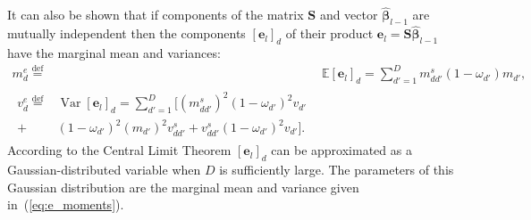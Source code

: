 \documentclass{article}
\begin{document}
 It can also be shown that if components of the matrix $\mathbf{S}$ and vector $\widehat{\boldsymbol\beta}_{l-1}$ are mutually independent then the components $[ \mathbf{e}_l ]_d$ of their product $\mathbf{e}_l = \mathbf{S} \widehat{\boldsymbol\beta}_{l-1}$ have the marginal mean and variances:
  \begin{subequations}
  \label{eq:e_moments}
  \begin{align}
  m^e_{d} \stackrel{\text{def}}{=} &\mathbb{E}[ \mathbf{e}_l ]_d = \sum_{d'=1}^D m^s_{dd'}(1-\omega_{d'})m_{d'}, \\
   \begin{split}
  v^e_{d} \stackrel{\text{def}}{=} &\operatorname{Var}[ \mathbf{e}_l ]_d = \sum_{d'=1}^D [(m^s_{dd'})^2(1-\omega_{d'})^2v_{d'} \\
   + &(1-\omega_{d'})^2(m_{d'})^2v^s_{dd'} + v^s_{dd'}(1-\omega_{d'})^2v_{d'}].
   \end{split}
   \end{align}
  \end{subequations}
According to the Central Limit Theorem $[ \mathbf{e}_l ]_d$ can be approximated as a Gaussian-distributed variable when $D$ is sufficiently large. The parameters of this Gaussian distribution are the marginal mean and variance given in~(\ref{eq:e_moments}).
\end{document}
